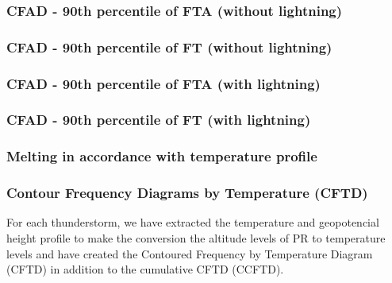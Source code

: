 \documentclass[smaller]{beamer}
\begin{document}
\begin{frame}
\frametitle{CFAD - 90th percentile of FTA (without lightning)}

\end{frame}

\begin{frame}
\frametitle{CFAD - 90th percentile of FT (without lightning)}

\end{frame}

\begin{frame}
\frametitle{CFAD - 90th percentile of FTA (with lightning) }

\end{frame}

\begin{frame}
\frametitle{CFAD - 90th percentile of FT (with lightning)}

\end{frame}



\begin{frame}
\frametitle{Melting in accordance with temperature profile}
\end{frame} 

\begin{frame}
\frametitle{Contour Frequency Diagrams by Temperature (CFTD)}
For each thunderstorm, we have extracted the temperature and
geopotencial height profile to make the conversion the altitude levels of PR to temperature levels and have created the Contoured Frequency by Temperature Diagram (CFTD) in addition to the cumulative CFTD (CCFTD).
\end{frame}
\end{document}
